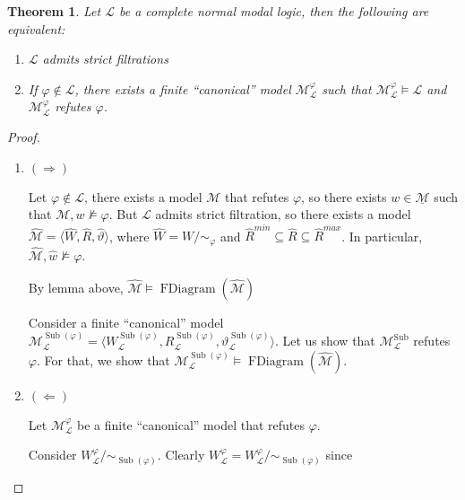 \documentclass[a4paper]{article}
\theoremstyle{defin}
\theoremstyle{theorem}
\newtheorem{theorem}{Theorem}
\theoremstyle{prop}
\theoremstyle{lemma}
\theoremstyle{ex}
\theoremstyle{col}
\begin{document}
\begin{theorem} Let $\mathcal{L}$ be a complete normal modal logic, then the following are equivalent:
  \begin{enumerate}
    \item $\mathcal{L}$ admits strict filtrations
    \item If $\varphi \not\in \mathcal{L}$, there exists a finite ``canonical'' model $\mathcal{M}_{\mathcal{L}}^{\varphi}$ such that
    $\mathcal{M}_{\mathcal{L}}^{\varphi} \models \mathcal{L}$ and
    $\mathcal{M}_{\mathcal{L}}^{\varphi}$ refutes $\varphi$.
  \end{enumerate}
\end{theorem}

\begin{proof}
  $ $

  \begin{enumerate}
    \item $(\Rightarrow)$

    Let $\varphi \not\in \mathcal{L}$, there exists a model $\mathcal{M}$ that refutes $\varphi$, so there exists $w \in \underline{\mathcal{M}}$ such that $\mathcal{M}, w \not\models \varphi$. But $\mathcal{L}$ admits strict filtration, so there exists a model $\widehat{\mathcal{M}} = \langle \widehat{W}, \widehat{R}, \widehat{\vartheta} \rangle$, where $\widehat{W} = W / \sim_{\varphi}$ and $\hat{R}^{min} \subseteq \widehat{R} \subseteq \hat{R}^{max}$. In particular, $\widehat{\mathcal{M}}, \widehat{w} \not\models \varphi$.

    By lemma above, $\widehat{\mathcal{M}} \models \operatorname{FDiagram}(\widehat{\mathcal{M}})$

    Consider a finite ``canonical'' model
    $\mathcal{M}_{\mathcal{L}}^{\operatorname{Sub}(\varphi)} = \langle W_{\mathcal{L}}^{\operatorname{Sub}(\varphi)}, R_{\mathcal{L}}^{\operatorname{Sub}(\varphi)}, \vartheta_{\mathcal{L}}^{\operatorname{Sub}(\varphi)} \rangle$.
    Let us show that $\mathcal{M}_{\mathcal{L}}^{\operatorname{Sub}}$ refutes $\varphi$. For that, we show that $\mathcal{M}_{\mathcal{L}}^{\operatorname{Sub}(\varphi)} \models \operatorname{FDiagram}(\widehat{\mathcal{M}})$.

    \item $(\Leftarrow)$

    Let $\mathcal{M}_{\mathcal{L}}^{\varphi}$ be a finite ``canonical'' model that refutes $\varphi$.

    Consider $W_{\mathcal{L}}^{\varphi} / \sim_{\operatorname{Sub}(\varphi)}$. Clearly $W_{\mathcal{L}}^{\varphi} = W_{\mathcal{L}}^{\varphi} / \sim_{\operatorname{Sub}(\varphi)}$ since


\end{enumerate}
\end{proof}
\end{document}
